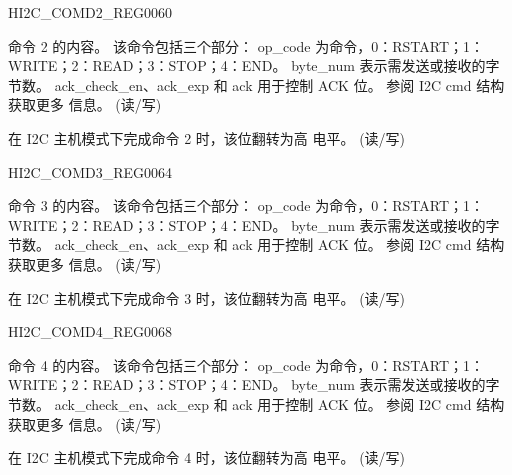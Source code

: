\begin{register}{H}{I2C\_COMD2\_REG}{\hexprefix{}0060}\label{regdesc:I2CCOMD2REG}
%
%
%
\regnewline%
\begin{regdesc}\begin{reglist}
\label{fielddesc:I2CCOMMAND2}\item [I2C\_COMMAND2] 命令 2 的内容。 该命令包括三个部分：
op\_code 为命令，0：RSTART；1：WRITE；2：READ；3：STOP；4：END。
byte\_num 表示需发送或接收的字节数。
ack\_check\_en、ack\_exp 和 ack 用于控制 ACK 位。 参阅 I2C cmd 结构获取更多
信息。 (读/写)
\label{fielddesc:I2CCOMMAND2DONE}\item [I2C\_COMMAND2\_DONE] 在 I2C 主机模式下完成命令 2 时，该位翻转为高
电平。 (读/写)
\end{reglist}\end{regdesc}
\end{register}


\begin{register}{H}{I2C\_COMD3\_REG}{\hexprefix{}0064}\label{regdesc:I2CCOMD3REG}
%
%
%
\regnewline%
\begin{regdesc}\begin{reglist}
\label{fielddesc:I2CCOMMAND3}\item [I2C\_COMMAND3] 命令 3 的内容。 该命令包括三个部分：
op\_code 为命令，0：RSTART；1：WRITE；2：READ；3：STOP；4：END。
byte\_num 表示需发送或接收的字节数。
ack\_check\_en、ack\_exp 和 ack 用于控制 ACK 位。 参阅 I2C cmd 结构获取更多
信息。 (读/写)
\label{fielddesc:I2CCOMMAND3DONE}\item [I2C\_COMMAND3\_DONE] 在 I2C 主机模式下完成命令 3 时，该位翻转为高
电平。 (读/写)
\end{reglist}\end{regdesc}
\end{register}


\begin{register}{H}{I2C\_COMD4\_REG}{\hexprefix{}0068}\label{regdesc:I2CCOMD4REG}
%
%
%
\regnewline%
\begin{regdesc}\begin{reglist}
\label{fielddesc:I2CCOMMAND4}\item [I2C\_COMMAND4] 命令 4 的内容。 该命令包括三个部分：
op\_code 为命令，0：RSTART；1：WRITE；2：READ；3：STOP；4：END。
byte\_num 表示需发送或接收的字节数。
ack\_check\_en、ack\_exp 和 ack 用于控制 ACK 位。 参阅 I2C cmd 结构获取更多
信息。 (读/写)
\label{fielddesc:I2CCOMMAND4DONE}\item [I2C\_COMMAND4\_DONE] 在 I2C 主机模式下完成命令 4 时，该位翻转为高
电平。 (读/写)
\end{reglist}\end{regdesc}
\end{register}


